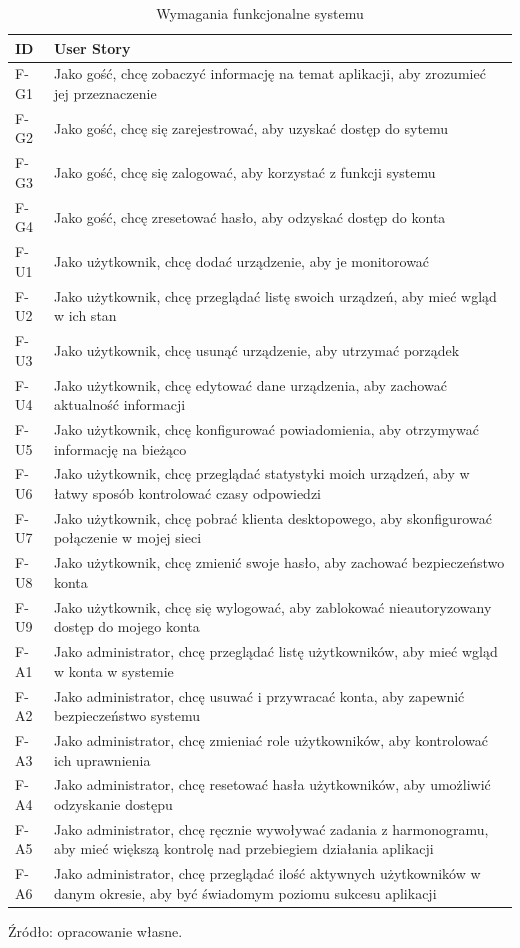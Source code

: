 \begin{table}[H]
	\centering
	\caption{Wymagania funkcjonalne systemu}
	\label{tab:functional-requirements}
	\vspace{10pt}
	
	\begin{tabular}{p{1cm} p{12cm}}
		\toprule
		ID & User Story \\
		\midrule
		
		F-G1 & Jako gość, chcę zobaczyć informację na temat aplikacji, aby zrozumieć jej przeznaczenie \\
		F-G2 & Jako gość, chcę się zarejestrować, aby uzyskać dostęp do sytemu \\
		F-G3 & Jako gość, chcę się zalogować, aby korzystać z funkcji systemu \\
		F-G4 & Jako gość, chcę zresetować hasło, aby odzyskać dostęp do konta \\
		F-U1 & Jako użytkownik, chcę dodać urządzenie, aby je monitorować \\
		F-U2 & Jako użytkownik, chcę przeglądać listę swoich urządzeń, aby mieć wgląd w ich stan \\
		F-U3 & Jako użytkownik, chcę usunąć urządzenie, aby utrzymać porządek \\
		F-U4 & Jako użytkownik, chcę edytować dane urządzenia, aby zachować aktualność informacji \\
		F-U5 & Jako użytkownik, chcę konfigurować powiadomienia, aby otrzymywać informację na bieżąco  \\
		F-U6 & Jako użytkownik, chcę przeglądać statystyki moich urządzeń, aby w łatwy sposób kontrolować czasy odpowiedzi \\
		F-U7 & Jako użytkownik, chcę pobrać klienta desktopowego, aby skonfigurować połączenie w mojej sieci  \\
		F-U8 & Jako użytkownik, chcę zmienić swoje hasło, aby zachować bezpieczeństwo konta \\
		F-U9 & Jako użytkownik, chcę się wylogować, aby zablokować nieautoryzowany dostęp do mojego konta \\
		F-A1 & Jako administrator, chcę przeglądać listę użytkowników, aby mieć wgląd w konta w systemie \\
		F-A2 & Jako administrator, chcę usuwać i przywracać konta, aby zapewnić bezpieczeństwo systemu \\
		F-A3 & Jako administrator, chcę zmieniać role użytkowników, aby kontrolować ich uprawnienia \\
		F-A4 & Jako administrator, chcę resetować hasła użytkowników, aby umożliwić odzyskanie dostępu \\
		F-A5 & Jako administrator, chcę ręcznie wywoływać zadania z harmonogramu, aby mieć większą kontrolę nad przebiegiem działania aplikacji \\
		F-A6 & Jako administrator, chcę przeglądać ilość aktywnych użytkowników w danym okresie, aby być świadomym poziomu sukcesu aplikacji \\
		
		\bottomrule
	\end{tabular}
	
	\vspace{10pt}
	\small Źródło: opracowanie własne.
\end{table}

